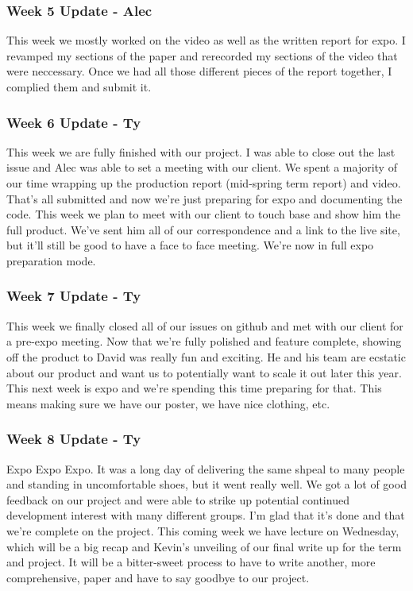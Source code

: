 \subsubsection{Week 5 Update - Alec}
This week we mostly worked on the video as well as the written report for expo.
I revamped my sections of the paper and rerecorded my sections of the video that were neccessary.
Once we had all those different pieces of the report together, I complied them and submit it.​

\subsubsection{Week 6 Update - Ty}
This week we are fully finished with our project.
I was able to close out the last issue and Alec was able to set a meeting with our client.
We spent a majority of our time wrapping up the production report (mid-spring term report) and video.
That's all submitted and now we're just preparing for expo and documenting the code.
​This week we plan to meet with our client to touch base and show him the full product.
We've sent him all of our correspondence and a link to the live site, but it'll still be good to have a face to face meeting.
We're now in full expo preparation mode.

\subsubsection{Week 7 Update - Ty}
This week we finally closed all of our issues on github and met with our client for a pre-expo meeting.
Now that we're fully polished and feature complete, showing off the product to David was really fun and exciting.
He and his team are ecstatic about our product and want us to potentially want to scale it out later this year.
This next week is expo and we're spending this time preparing for that.
This means making sure we have our poster, we have nice clothing, etc. ​

\subsubsection{Week 8 Update - Ty}
Expo Expo Expo.
It was a long day of delivering the same shpeal to many people and standing in uncomfortable shoes, but it went really well.
We got a lot of good feedback on our project and were able to strike up potential continued development interest with many different groups.
I'm glad that it's done and that we're complete on the project.
This coming week we have lecture on Wednesday, which will be a big recap and Kevin's unveiling of our final write up for the term and project.
It will be a bitter-sweet process to have to write another, more comprehensive, paper and have to say goodbye to our project. ​​

